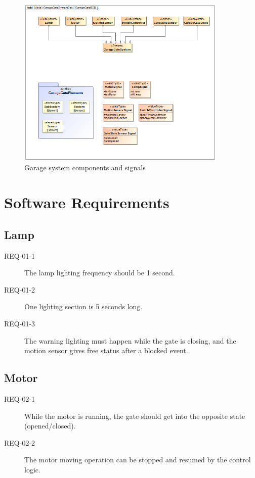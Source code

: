 \begin{figure}[!ht]
	\centering
	\includegraphics[width=100mm, keepaspectratio]{figures/magicDraw/bdd__GarageGateBDD.png}
	\caption{Garage system components and signals}
	\label{fig:overalBDD}
\end{figure}

\section{Software Requirements}\label{subsect:SW-REQ}
\subsection{Lamp}
\begin{description}
	\item [REQ-01-1] The lamp lighting frequency should be 1 second.
	\item [REQ-01-2] One lighting section is 5 seconds long.
	\item [REQ-01-3] The warning lighting must happen while the gate is closing, and the motion sensor gives free status after a blocked event.
\end{description}

\subsection{Motor}
\begin{description}
	\item [REQ-02-1] While the motor is running, the gate should get into the opposite state (opened/closed).
	\item [REQ-02-2] The motor moving operation can be stopped and resumed by the control logic.
\end{description}

